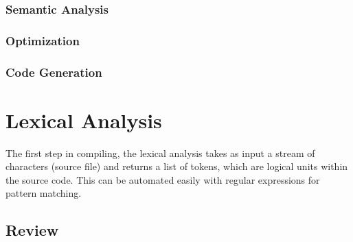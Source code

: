 \documentclass{report}
\theoremstyle{definition}
\begin{document}
		\subsection{Semantic Analysis}
		\subsection{Optimization}
		\subsection{Code Generation}
\chapter{Lexical Analysis}
	The first step in compiling, the lexical analysis takes as input a stream of characters (source file) and returns a list of tokens, which are 
	logical units within the source code. This can be automated easily with regular expressions for pattern matching.
	
	\section{Review}
\end{document}
